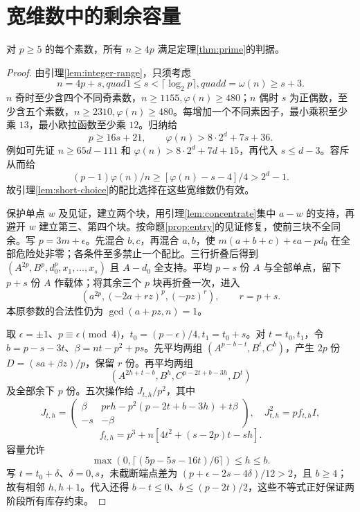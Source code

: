 \section{宽维数中的剩余容量}\label{sec:wide}
\begin{proposition}\label{prop:wide}
对 $p\ge5$ 的每个素数，所有 $n\ge4p$ 满足定理\ref{thm:prime}的判据。
\end{proposition}
\begin{proof}
由引理\ref{lem:integer-range}，只须考虑
\begin{equation}\label{eq:tail-range}
n=4p+s,quad1\le s<\lceil\log_2p\rceil,quad d=\omega(n)\ge s+3.
\end{equation}
$n$ 奇时至少含四个不同奇素数，$n\ge1155,\varphi(n)\ge480$；$n$ 偶时 $s$ 为正偶数，至少含五个素数，$n\ge2310,\varphi(n)\ge480$。每增加一个不同素因子，最小乘积至少乘 $13$，最小欧拉函数至少乘 $12$。归纳给
\begin{equation}\label{eq:tail-estimates}
p\ge16s+21,\qquad \varphi(n)>8\cdot2^d+7s+36.
\end{equation}
例如可先证 $n\ge65d-111$ 和 $\varphi(n)>8\cdot2^d+7d+15$，再代入 $s\le d-3$。容斥从而给
\[(p-1)\varphi(n)/n\ge[\varphi(n)-s-4]/4>2^d-1.
\]
故引理\ref{lem:short-choice}的配比选择在这些宽维数仍有效。

保护单点 $w$ 及见证，建立两个块，用引理\ref{lem:concentrate}集中 $a-w$ 的支持，再避开 $w$ 建立第三、第四个块。按命题\ref{prop:entry}的见证修复，使前三块不全同余。写 $p=3m+\epsilon$。先混合 $b,c$，再混合 $a,b$，使 $m(a+b+c)+\epsilon a-pd_0$ 在全部危险处非零；各条件至多禁止一个配比。三行折叠后得到 $(A^{2p},B^p,d_0^p,x_1,\ldots,x_s)$ 且 $A-d_0$ 全支持。平均 $p-s$ 份 $A$ 与全部单点，留下 $p+s$ 份 $A$ 作载体；将其余三个 $p$ 块再折叠一次，进入
\begin{equation}\label{eq:wide-core}
(a^{2p},(-2a+rz)^p,(-pz)^r),\qquad r=p+s.
\end{equation}
本原参数的合法性仍为 $\gcd(a+pz,n)=1$。

取 $\epsilon=\pm1$、$p\equiv\epsilon\pmod4$，$t_0=(p-\epsilon)/4,t_1=t_0+s$。对 $t=t_0,t_1$，令 $b=p-s-3t$、$\beta=nt-p^2+ps$。先平均两组 $(A^{p-b-t},B^t,C^b)$，产生 $2p$ 份 $D=(sa+\beta z)/p$，保留 $r$ 份。再平均两组
\[
(A^{2h+t-b},B^h,C^{p-2t+b-3h},D^t)
\]
及全部余下 $p$ 份。五次操作给 $J_{t,h}/p^2$，其中
\begin{equation}\label{eq:tail-J}
J_{t,h}=\begin{pmatrix}\beta&prh-p^2(p-2t+b-3h)+t\beta\\-s&-\beta\end{pmatrix},
\quad J_{t,h}^2=pf_{t,h}I,
\end{equation}
\[
f_{t,h}=p^3+n[4t^2+(s-2p)t-sh].
\]
容量允许
\[
\max(0,\lceil(5p-5s-16t)/6\rceil)\le h\le b.
\]
写 $t=t_0+\delta$、$\delta=0,s$，未截断端点差为 $(p+\epsilon-2s-4\delta)/12>2$，且 $b\ge4$；故有相邻 $h,h+1$。代入还得 $b-t\le0$、$b\le(p-2t)/2$，这些不等式正好保证两阶段所有库存约束。


\end{proof}
